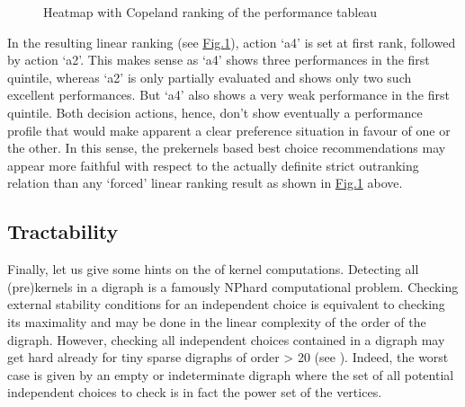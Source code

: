 \documentclass[a4paper,10pt,english]{sphinxhowto}
\let\sphinxpxdimen\pdfpxdimen\else\newdimen\sphinxpxdimen
\begin{document}
\begin{figure}[htbp]
\centering
\capstart

\noindent\sphinxincludegraphics[width=550\sphinxpxdimen]{{outrankingResult}.png}
\caption{Heatmap with Copeland ranking of the performance tableau}\label{\detokenize{tutorial:outrankingresult}}\end{figure}

In the resulting linear ranking (see \hyperref[\detokenize{tutorial:outrankingresult}]{Fig.\@ \ref{\detokenize{tutorial:outrankingresult}}}), action ‘a4’ is set at first rank, followed by action ‘a2’. This makes sense as ‘a4’ shows three performances in the first quintile, whereas ‘a2’ is only partially evaluated and shows only two such excellent performances. But ‘a4’ also shows a very weak performance in the first quintile. Both decision actions, hence, don’t show eventually a performance profile that would make apparent a clear preference situation in favour of one or the other. In this sense, the prekernels based best choice recommendations may appear more faithful with respect to the actually definite strict outranking relation than any ‘forced’ linear ranking result as shown in \hyperref[\detokenize{tutorial:outrankingresult}]{Fig.\@ \ref{\detokenize{tutorial:outrankingresult}}} above.


\subsection{Tractability}
\label{\detokenize{tutorial:tractability}}
Finally, let us give some hints on the  of kernel computations. Detecting all (pre)kernels in a digraph is a famously NP\sphinxhyphen{}hard computational problem. Checking external stability conditions for an independent choice is equivalent to checking its maximality and may be done in the linear complexity of the order of the digraph. However, checking all independent choices contained in a digraph may get hard already for tiny sparse digraphs of order  \textgreater{} 20 (see ). Indeed, the worst case is given by an empty or indeterminate digraph where the set of all potential independent choices to check is in fact the power set of the vertices.
\end{document}
